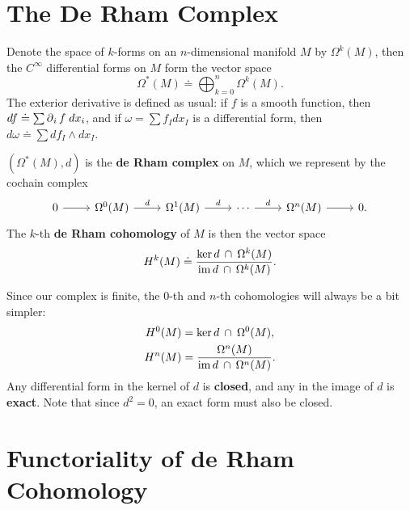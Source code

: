 \documentclass[twoside,10pt]{report}
\begin{document}


\section{The De Rham Complex}

Denote the space of $k$-forms on an $n$-dimensional manifold $M$ by $\Omega^{k}(M)$, then the $C^{\infty}$ differential forms on $M$ form the vector space
\[
	\Omega^{*}(M) \doteq \bigoplus_{k=0}^{n} \Omega^{k}(M).
\] The exterior derivative is defined as usual: if $f$ is a smooth function, then $df \doteq \sum \operatorname{\partial}_{i}{f} \;dx_i$, and if $\omega = \sum f_{I}dx_{I}$ is a differential form, then $d\omega \doteq \sum df_{I} \wedge dx_{I}$.

\begin{defn}[]
$\left( \Omega^{*}(M), d \right)$ is the \textbf{de Rham complex} on $M$, which we represent by the cochain complex
\[
\begin{tikzcd}
	0\rar &\Omega^{0}(M) \rar{d}&\Omega^{1}(M)\rar{d}&\cdots\rar{d}&\Omega^{n}(M)\rar&0.
\end{tikzcd}
\] The $k$-th \textbf{de Rham cohomology} of $M$ is then the vector space
\[
	H^{k}(M) \doteq \frac{\ker d \operatorname{\;\cap\;}\Omega^{k}(M)}{\operatorname{im} d \operatorname{\;\cap\;} \Omega^{k}(M)} .
\] 
\end{defn}
Since our complex is finite, the $0$-th and $n$-th cohomologies will always be a bit simpler:
\begin{align*}
	H^{0}(M) &= \ker d \operatorname{\;\cap\;} \Omega^{0}(M),\\
	H^{n}(M) &= \frac{\Omega^{n}(M)}{\operatorname{im} d \operatorname{\;\cap\;} \Omega^{n}(M)} .
\end{align*}
Any differential form in the kernel of $d$ is \textbf{closed}, and any in the image of $d$ is \textbf{exact}. Note that since $d^{2}=0$, an exact form must also be closed.


\section{Functoriality of de Rham Cohomology}
\end{document}
